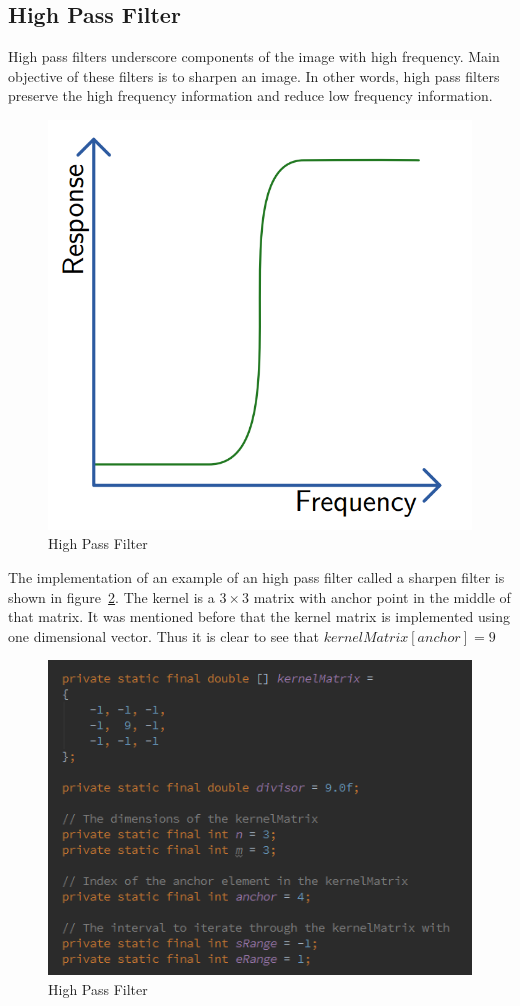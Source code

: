 \documentclass{article}
\begin{document}
\subsection{High Pass Filter}

High pass filters underscore components of the image with high frequency. Main objective of these filters is to sharpen an image. In other words, high pass filters preserve the high frequency information and reduce low frequency information.

\begin{figure}[H]
\centering

  \includegraphics[width=0.5\linewidth]{res/high_pass_graph.png}
  
\caption{High Pass Filter}
\label{fig:high_pass_graph}
\end{figure}


The implementation of an example of an high pass filter called a sharpen filter is shown in figure~\ref{fig:alg_high_pass}.  The kernel is a $3 \times 3$ matrix with anchor point in the middle of that matrix. It was mentioned before that the kernel matrix is implemented using one dimensional vector. Thus it is clear to see that $kernelMatrix[anchor] = 9$

\begin{figure}[H]
\centering

  \includegraphics[width=0.9\linewidth]{res/algorithms/high_pass.png}
  
\caption{High Pass Filter}
\label{fig:alg_high_pass}
\end{figure}
\end{document}
